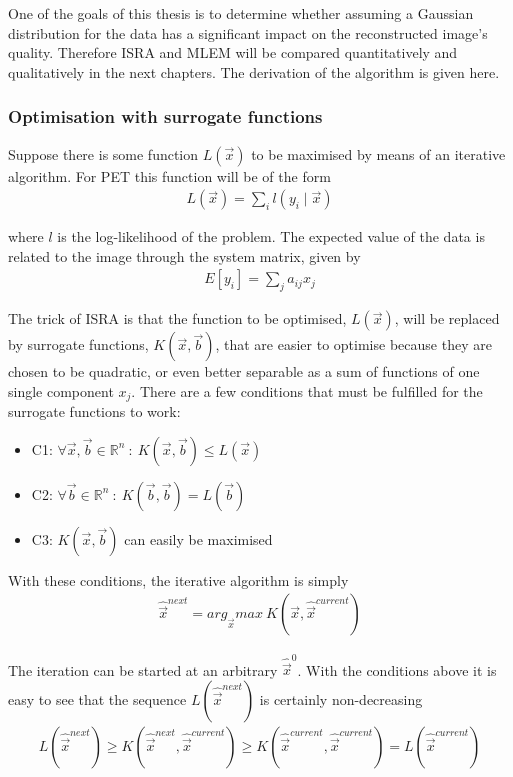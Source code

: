 \documentclass[report,12pt]{report}
\begin{document}
One of the goals of this thesis is to determine whether assuming a Gaussian distribution for the data has a significant impact on the reconstructed image's quality. Therefore ISRA and MLEM will be compared quantitatively and qualitatively in the next chapters. The derivation of the algorithm is given here.




\subsubsection*{Optimisation with surrogate functions}
Suppose there is some function $L(\vec x)$ to be maximised by means of an iterative algorithm. For PET this function will be of the form
\begin{align}
	L(\vec x) = \sum_i l(y_i \mid \vec x)
\end{align}

where $l$ is the log-likelihood of the problem. The expected value of the data is related to the image through the system matrix, given by
\begin{align}
	E[y_i] = \sum_j a_{ij}x_j
\end{align}
	
The trick of ISRA is that the function to be optimised, $L(\vec x)$, will be replaced by surrogate functions, $K(\vec x, \vec b )$, that are easier to optimise because they are chosen to be quadratic, or even better separable as a sum of functions of one single component $x_j$. There are a few conditions that must be fulfilled for the surrogate functions to work:
\begin{itemize}
	\item C1: $\forall \vec x, \vec b \in \mathbb{R}^n \ :\ K(\vec x, \vec b) \leq L(\vec x)$
	\item C2: $\forall \vec b \in \mathbb{R}^n \ :\ K(\vec b,\vec b) = L(\vec b)$
	\item C3: $K(\vec x, \vec b)$ can easily be maximised
\end{itemize}

With these conditions, the iterative algorithm is simply
\begin{align}
	\hat {\vec x}^{next} = arg_{\hat {\vec x}}max\ K(\vec x,\hat {\vec x}^{current})
\end{align}

The iteration can be started at an arbitrary $\hat {\vec x}^0$. With the conditions above it is easy to see that the sequence $L(\hat {\vec x}^{next})$ is certainly non-decreasing
\begin{align}
	L(\hat {\vec x}^{next}) \geq K(\hat {\vec x}^{next},\hat {\vec x}^{current}) \geq K(\hat {\vec x}^{current},\hat {\vec x}^{current}) = L(\hat {\vec x}^{current})
\end{align}
\end{document}
